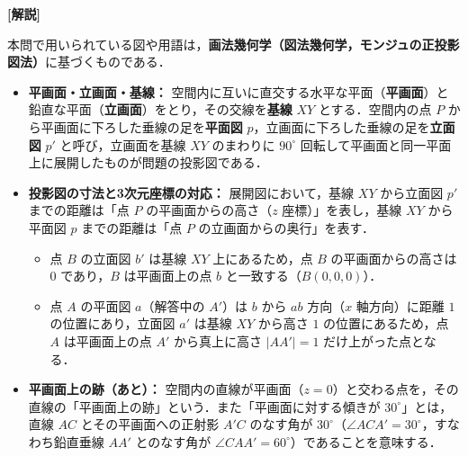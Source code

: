\documentclass[../../main.tex]{subfiles}
\begin{document}
{\bf [解説]}

本問で用いられている図や用語は，\textbf{画法幾何学（図法幾何学，モンジュの正投影図法）}に基づくものである．

\begin{itemize}
  \item {\bf 平画面・立画面・基線：} 空間内に互いに直交する水平な平面（\textbf{平画面}）と鉛直な平面（\textbf{立画面}）をとり，その交線を\textbf{基線} $XY$ とする．空間内の点 $P$ から平画面に下ろした垂線の足を\textbf{平面図} $p$，立画面に下ろした垂線の足を\textbf{立面図} $p'$ と呼び，立画面を基線 $XY$ のまわりに $90^\circ$ 回転して平画面と同一平面上に展開したものが問題の投影図である．
  \item {\bf 投影図の寸法と3次元座標の対応：} 展開図において，基線 $XY$ から立面図 $p'$ までの距離は「点 $P$ の平画面からの高さ（$z$ 座標）」を表し，基線 $XY$ から平面図 $p$ までの距離は「点 $P$ の立画面からの奥行」を表す．
    \begin{itemize}
      \item 点 $B$ の立面図 $b'$ は基線 $XY$ 上にあるため，点 $B$ の平画面からの高さは $0$ であり，$B$ は平画面上の点 $b$ と一致する（$B(0,0,0)$）．
      \item 点 $A$ の平面図 $a$（解答中の $A'$）は $b$ から $ab$ 方向（$x$ 軸方向）に距離 $1$ の位置にあり，立面図 $a'$ は基線 $XY$ から高さ $1$ の位置にあるため，点 $A$ は平画面上の点 $A'$ から真上に高さ $|AA'|=1$ だけ上がった点となる．
    \end{itemize}
  \item {\bf 平画面上の跡（あと）：} 空間内の直線が平画面（$z=0$）と交わる点を，その直線の「平画面上の跡」という．また「平画面に対する傾きが $30^\circ$」とは，直線 $AC$ とその平画面への正射影 $A'C$ のなす角が $30^\circ$（$\angle ACA'=30^\circ$，すなわち鉛直垂線 $AA'$ とのなす角が $\angle CAA'=60^\circ$）であることを意味する．
\end{itemize}
\end{document}
